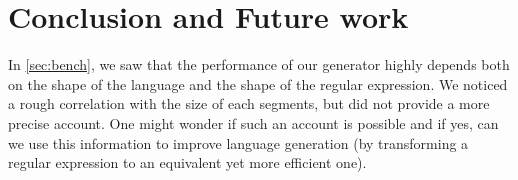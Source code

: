 \section{Conclusion and Future work}

\TODO{}

In \cref{sec:bench}, we saw that the performance of our generator highly depends
both on the shape of the language and the shape of the regular expression.
We noticed a rough correlation with the size of each segments, but did not
provide a more precise account. One might wonder if such an account is possible
and if yes, can we use this information to improve language generation
(by transforming a regular expression to an equivalent yet more efficient one).



